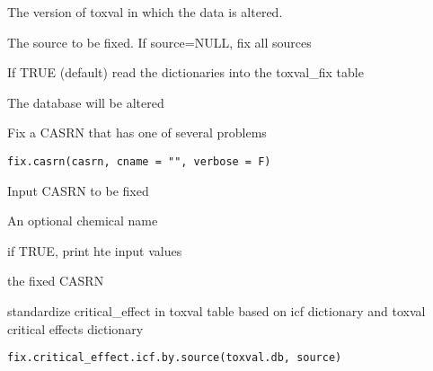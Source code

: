 \documentclass[letterpaper]{book}
\begin{document}
%
\begin{Arguments}
\begin{ldescription}
\item[\code{toxval.db}] The version of toxval in which the data is altered.

\item[\code{source}] The source to be fixed. If source=NULL, fix all sources

\item[\code{fill.toxval\_fix}] If TRUE (default) read the dictionaries into the toxval\_fix table
\end{ldescription}
\end{Arguments}
%
\begin{Value}
The database will be altered
\end{Value}
%
\begin{Description}\relax
Fix a CASRN that has one of several problems
\end{Description}
%
\begin{Usage}
\begin{verbatim}
fix.casrn(casrn, cname = "", verbose = F)
\end{verbatim}
\end{Usage}
%
\begin{Arguments}
\begin{ldescription}
\item[\code{casrn}] Input CASRN to be fixed

\item[\code{cname}] An optional chemical name

\item[\code{verbose}] if TRUE, print hte input values
\end{ldescription}
\end{Arguments}
%
\begin{Value}
the fixed CASRN
\end{Value}
%
\begin{Description}\relax
standardize critical\_effect in toxval table based on icf dictionary and toxval critical effects dictionary
\end{Description}
%
\begin{Usage}
\begin{verbatim}
fix.critical_effect.icf.by.source(toxval.db, source)
\end{verbatim}
\end{Usage}
\end{document}
